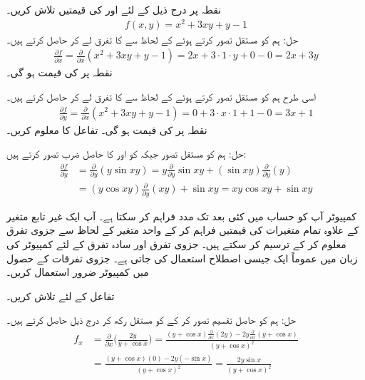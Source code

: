 نقطہ  پر درج ذیل کے لئے  اور  کی قیمتیں تلاش کریں۔
\begin{align*}
f(x,y)=x^2+3xy+y-1
\end{align*}
حل:\quad
ہم  کو مستقل تصور کرتے ہوئے  کے لحاظ سے  کا تفرق لے کر    حاصل کرتے ہیں۔
\begin{align*}
\frac{\partial f}{\partial x}=\frac{\partial}{\partial x}(x^2+3xy+y-1)=2x+3\cdot 1\cdot y+0-0=2x+3y
\end{align*}
نقطہ  پر  کی قیمت  ہو گی۔

اسی طرح ہم  کو مستقل تصور کرتے ہوئے  کے لحاظ سے  کا تفرق لے کر    حاصل کرتے ہیں۔
\begin{align*}
\frac{\partial f}{\partial y}=\frac{\partial}{\partial x}(x^2+3xy+y-1)=0+3\cdot x\cdot 1+1-0=3x+1
\end{align*}
نقطہ  پر  کی قیمت  ہو گی۔
تفاعل  کا  معلوم کریں۔

حل:\quad
ہم  کو مستقل  تصور جبکہ   کو  اور  کا حاصل ضرب تصور کرتے ہیں:
\begin{align*}
\frac{\partial f}{\partial y}&=\frac{\partial}{\partial y}(y\sin xy)=y\frac{\partial}{\partial y}\sin xy+(\sin xy)\frac{\partial}{\partial y}(y)\\
&=(y\cos xy)\frac{\partial}{\partial y}(xy) +\sin xy=xy\cos xy+\sin xy
\end{align*}

\quad کمپیوٹر آپ کو حساب میں کئی بعد  تک مدد فراہم کر سکتا ہے۔ آپ ایک غیر تابع متغیر کے علاوہ تمام متغیرات کی قیمتیں فراہم کر کے واحد  متغیر کے لحاظ سے جزوی تفرق معلوم کر  کے  ترسیم کر سکتے ہیں۔ جزوی تفرق اور سادہ تفرق کے لئے کمپیوٹر کی زبان میں عموماً  ایک جیسی اصطلاح استعمال کی جاتی ہے۔  جزوی تفرقات کے حصول میں کمپیوٹر ضرور استعمال کریں۔

تفاعل  کے لئے  تلاش کریں۔

حل:\quad
ہم  کو حاصل تقسیم تصور کر کے  کو مستقل رکھ کر درج ذیل حاصل کرتے ہیں۔
\begin{align*}
f_x&=\frac{\partial}{\partial x}\big(\frac{2y}{y+\cos x}\big)=\frac{(y+\cos x)\tfrac{\partial}{\partial x}(2y)-2y\tfrac{\partial}{\partial x}(y+\cos x)}{(y+\cos x)^2}\\
&=\frac{(y+\cos x)(0)-2y(-\sin x)}{(y+\cos x)^2}=\frac{2y\sin x}{(y+\cos x)^2}
\end{align*}

